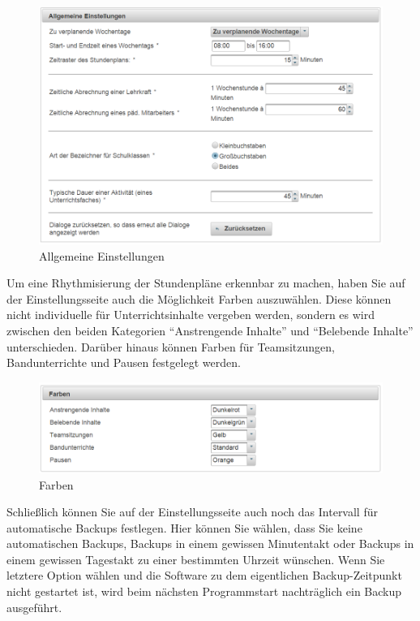 \documentclass[fontsize=12pt]{scrartcl}
\begin{document}
\begin{figure}[H]
\includegraphics[width=\textwidth]{images/systemSettings2.png}
\caption{Allgemeine Einstellungen}
\end{figure}


Um eine Rhythmisierung der Stundenpläne erkennbar zu machen, haben Sie auf der Einstellungsseite auch die Möglichkeit Farben auszuwählen. Diese können nicht individuelle für Unterrichtsinhalte vergeben werden, sondern es wird zwischen den beiden Kategorien "`Anstrengende Inhalte"' und "`Belebende Inhalte"' unterschieden. Darüber hinaus können Farben für Teamsitzungen, Bandunterrichte und Pausen festgelegt werden.
\begin{figure}[H]
\includegraphics[width=\textwidth]{images/systemSettings3.png}
\caption{Farben}
\end{figure}

Schließlich können Sie auf der Einstellungsseite auch noch das Intervall für automatische Backups festlegen. Hier können Sie wählen, dass Sie keine automatischen Backups, Backups in einem gewissen Minutentakt oder Backups in einem gewissen Tagestakt zu einer bestimmten Uhrzeit wünschen. Wenn Sie letztere Option wählen und die Software zu dem eigentlichen Backup-Zeitpunkt nicht gestartet ist, wird beim nächsten Programmstart nachträglich ein Backup ausgeführt.
\end{document}

